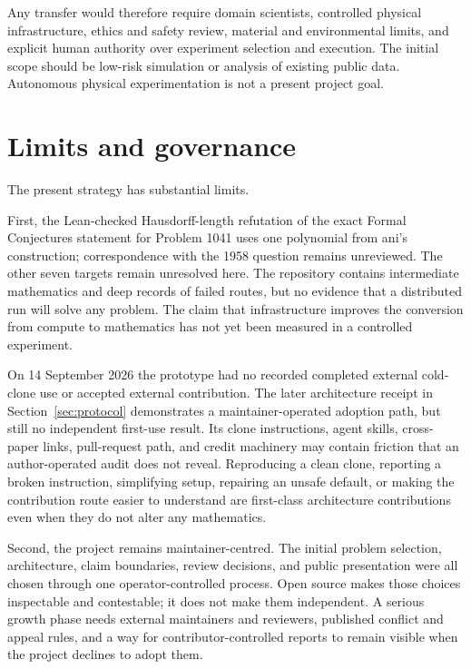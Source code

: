 \documentclass[10pt]{article}
\begin{document}
Any transfer would therefore require domain scientists, controlled physical
infrastructure, ethics and safety review, material and environmental limits,
and explicit human authority over experiment selection and execution.  The
initial scope should be low-risk simulation or analysis of existing public
data.  Autonomous physical experimentation is not a present project goal.

\section{Limits and governance}\label{sec:limits}

The present strategy has substantial limits.

First, the Lean-checked Hausdorff-length refutation of the exact Formal
Conjectures statement for Problem 1041 uses one polynomial from ani's
construction; correspondence with the 1958 question remains unreviewed.
The other seven targets remain unresolved here. The repository contains intermediate
mathematics and deep records of failed routes, but no evidence
that a distributed run will solve any problem.  The claim that infrastructure
improves the conversion from compute to mathematics has not yet been measured
in a controlled experiment.

On 14 September 2026 the prototype had no recorded completed external
cold-clone use or accepted external contribution. The later architecture
receipt in Section~\ref{sec:protocol} demonstrates a maintainer-operated
adoption path, but still no independent first-use result. Its clone
instructions, agent skills, cross-paper links, pull-request path, and credit
machinery may contain friction that an author-operated audit does not reveal.
Reproducing a clean clone, reporting a
broken instruction, simplifying setup, repairing an unsafe default, or making
the contribution route easier to understand are first-class architecture
contributions even when they do not alter any mathematics.

Second, the project remains maintainer-centred.  The initial problem
selection, architecture, claim boundaries, review decisions, and public
presentation were all chosen through one operator-controlled process.  Open
source makes those choices inspectable and contestable; it does not make them
independent.  A serious growth phase needs external maintainers and reviewers,
published conflict and appeal rules, and a way for contributor-controlled
reports to remain visible when the project declines to adopt them.
\end{document}
